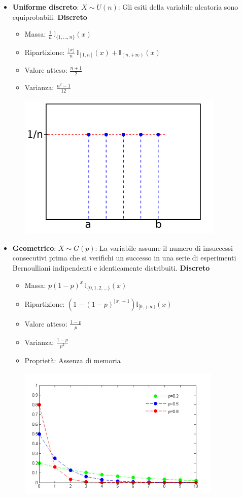 \documentclass{article}
\begin{document}
\begin{itemize}
    \item \textbf{Uniforme discreto}: $X \sim U(n)$: Gli esiti della variabile aleatoria sono equiprobabili. \textbf{Discreto}
    \begin{itemize}
        \item Massa: $\frac{1}{n} \, \mathbb{I}_{\{1, ..., n\}}(x)$
        \item Ripartizione: $\frac{\lfloor x \rfloor}{n} \, \mathbb{I}_{[1, n]}(x) + \mathbb{I}_{(n, +\infty)}(x)$
        \item Valore atteso: $\frac{n+1}{2}$
        \item Varianza: $\frac{n^2 - 1}{12}$
        \begin{center}
            \includegraphics[width=0.4\linewidth]{./immagini/uniformeDiscreto.png}
        \end{center}
    \end{itemize}

    \item \textbf{Geometrico}: $X \sim G(p)$: La variabile assume il numero di insuccessi consecutivi prima che si veriﬁchi un successo in una serie di esperimenti Bernoulliani indipendenti e identicamente distribuiti. \textbf{Discreto}
    \begin{itemize}
        \item Massa: $p(1-p)^x \, \mathbb{I}_{\{0, 1, 2, \dots\}}(x)$
        \item Ripartizione: $\left(1 - (1-p)^{\lfloor x \rfloor + 1} \right) \mathbb{I}_{[0, +\infty)}(x)$
        \item Valore atteso: $\frac{1-p}{p}$
        \item Varianza: $\frac{1-p}{p^2}$
        \item Proprietà: Assenza di memoria
        \begin{center}
            \includegraphics[width=0.4\linewidth]{./immagini/geometrico.png}
        \end{center}
    \end{itemize}


\end{itemize}
\end{document}
